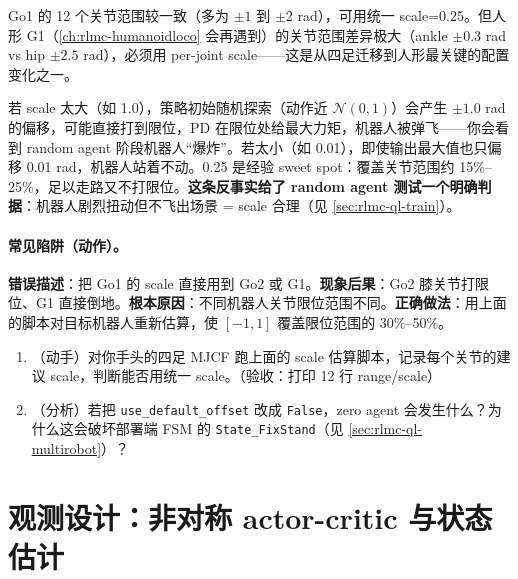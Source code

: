 Go1 的 12 个关节范围较一致（多为 $\pm 1$ 到 $\pm 2$ rad），可用统一 scale=0.25。但人形 G1（\cref{ch:rlmc-humanoidloco} 会再遇到）的关节范围差异极大（ankle $\pm 0.3$ rad vs hip $\pm 2.5$ rad），必须用 per-joint scale——这是从四足迁移到人形最关键的配置变化之一。

\begin{insight}\label{ins:rlmc-ql-scale}
若 scale 太大（如 1.0），策略初始随机探索（动作近 $\mathcal{N}(0,1)$）会产生 $\pm 1.0$ rad 的偏移，可能直接打到限位，PD 在限位处给最大力矩，机器人被弹飞——你会看到 random agent 阶段机器人“爆炸”。若太小（如 0.01），即使输出最大值也只偏移 0.01 rad，机器人站着不动。0.25 是经验 sweet spot：覆盖关节范围约 15\%--25\%，足以走路又不打限位。\textbf{这条反事实给了 random agent 测试一个明确判据}：机器人剧烈扭动但不飞出场景 = scale 合理（见 \cref{sec:rlmc-ql-train}）。
\end{insight}

\paragraph{常见陷阱（动作）。}

\begin{pitfall}
\textbf{错误描述}：把 Go1 的 scale 直接用到 Go2 或 G1。\textbf{现象后果}：Go2 膝关节打限位、G1 直接倒地。\textbf{根本原因}：不同机器人关节限位范围不同。\textbf{正确做法}：用上面的脚本对目标机器人重新估算，使 $[-1,1]$ 覆盖限位范围的 30\%--50\%。
\end{pitfall}

\begin{practice}[动作链路]
\begin{enumerate}
\item （动手）对你手头的四足 MJCF 跑上面的 scale 估算脚本，记录每个关节的建议 scale，判断能否用统一 scale。（验收：打印 12 行 range/scale）
\item （分析）若把 \verb|use_default_offset| 改成 \verb|False|，zero agent 会发生什么？为什么这会破坏部署端 FSM 的 \verb|State_FixStand|（见 \cref{sec:rlmc-ql-multirobot}）？
\end{enumerate}
\end{practice}

\section{观测设计：非对称 actor-critic 与状态估计}
\label{sec:rlmc-ql-obs}

